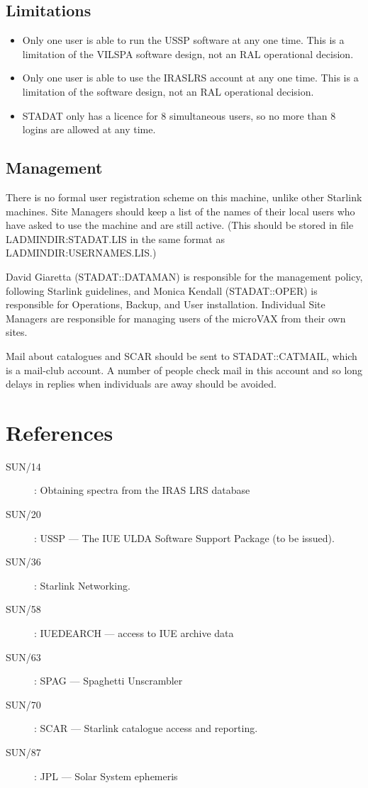 \subsection{Limitations}

\begin{itemize}
\item Only one user is able to run the USSP software at any one time.
This is a limitation of the VILSPA software design, not an RAL operational
decision.
\item Only one user is able to use the IRASLRS account at any one time.
This is a limitation of the software design, not an RAL operational
decision.
\item STADAT only has a licence for 8 simultaneous users, so no more than 8
logins are allowed at any time.
\end {itemize}

\subsection{Management}

There is no formal user registration scheme on this machine, unlike other
Starlink machines.
Site Managers should keep a list of the names of their local users who have
asked to use the machine and are still active.
(This should be stored in file LADMINDIR:STADAT.LIS in the same format as
LADMINDIR:USERNAMES.LIS.)

David Giaretta (STADAT::DATAMAN)
is responsible for the management policy, following Starlink
guidelines, and
Monica Kendall (STADAT::OPER) is responsible for Operations,
Backup, and User installation.
Individual Site Managers are responsible for managing users of the microVAX
from their own sites.

Mail about catalogues and SCAR
should be sent to STADAT::CATMAIL, which is a mail-club account. A number
of people  check mail in this account and so long delays in replies when
individuals are away should be avoided.

\section{References}

\begin{description}
\item [SUN/14] : Obtaining spectra from the IRAS LRS database
\item [SUN/20] : USSP --- The IUE ULDA Software Support Package (to be issued).
\item [SUN/36] : Starlink Networking.
\item [SUN/58] : IUEDEARCH --- access to IUE archive data
\item [SUN/63] : SPAG --- Spaghetti Unscrambler
\item [SUN/70] : SCAR --- Starlink catalogue access and reporting.
\item [SUN/87] : JPL --- Solar System ephemeris
\end{description}


